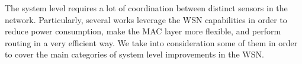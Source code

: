 The system level requires a lot of coordination between distinct sensors in the
network. Particularly, several works leverage the WSN capabilities in order to
reduce power consumption, make the MAC layer more flexible, and perform routing
in a very efficient way. We take into consideration some of them in order to
cover the main categories of system level improvements in the WSN.




